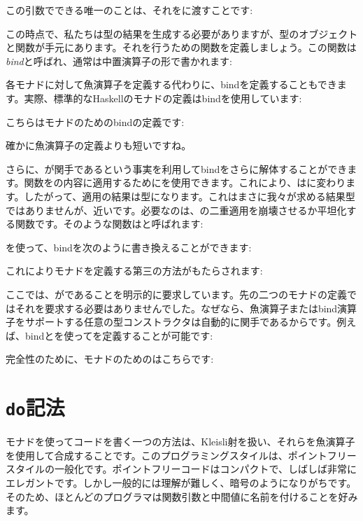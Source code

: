 この引数でできる唯一のことは、それをに渡すことです: 

この時点で、私たちは型の結果を生成する必要がありますが、型のオブジェクトと関数が手元にあります。それを行うための関数を定義しましょう。この関数は\emph{bind}と呼ばれ、通常は中置演算子の形で書かれます: 

各モナドに対して魚演算子を定義する代わりに、bindを定義することもできます。実際、標準的なHaskellのモナドの定義はbindを使用しています: 

こちらはモナドのためのbindの定義です: 

確かに魚演算子の定義よりも短いですね。

さらに、が関手であるという事実を利用してbindをさらに解体することができます。関数をの内容に適用するためにを使用できます。これにより、はに変わります。したがって、適用の結果は型になります。これはまさに我々が求める結果型ではありませんが、近いです。必要なのは、の二重適用を崩壊させるか平坦化する関数です。そのような関数はと呼ばれます: 

を使って、bindを次のように書き換えることができます: 

これによりモナドを定義する第三の方法がもたらされます: 

ここでは、がであることを明示的に要求しています。先の二つのモナドの定義ではそれを要求する必要はありませんでした。なぜなら、魚演算子またはbind演算子をサポートする任意の型コンストラクタは自動的に関手であるからです。例えば、bindとを使ってを定義することが可能です: 

完全性のために、モナドのためのはこちらです: 


\section{\texttt{do}記法}

モナドを使ってコードを書く一つの方法は、Kleisli射を扱い、それらを魚演算子を使用して合成することです。このプログラミングスタイルは、ポイントフリースタイルの一般化です。ポイントフリーコードはコンパクトで、しばしば非常にエレガントです。しかし一般的には理解が難しく、暗号のようになりがちです。そのため、ほとんどのプログラマは関数引数と中間値に名前を付けることを好みます。

